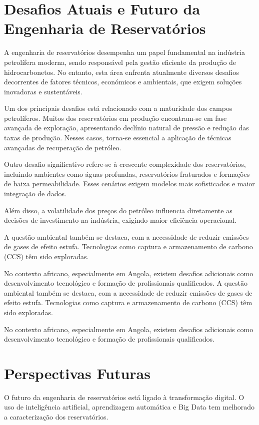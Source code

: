 \documentclass[12pt,a4paper]{report}
\begin{document}
\chapter{Desafios Atuais e Futuro da Engenharia de Reservatórios}

A engenharia de reservatórios desempenha um papel fundamental na indústria petrolífera moderna, sendo responsável pela gestão eficiente da produção de hidrocarbonetos. No entanto, esta área enfrenta atualmente diversos desafios decorrentes de fatores técnicos, económicos e ambientais, que exigem soluções inovadoras e sustentáveis.

Um dos principais desafios está relacionado com a maturidade dos campos petrolíferos. Muitos dos reservatórios em produção encontram-se em fase avançada de exploração, apresentando declínio natural de pressão e redução das taxas de produção. Nesses casos, torna-se essencial a aplicação de técnicas avançadas de recuperação de petróleo.

Outro desafio significativo refere-se à crescente complexidade dos reservatórios, incluindo ambientes como águas profundas, reservatórios fraturados e formações de baixa permeabilidade. Esses cenários exigem modelos mais sofisticados e maior integração de dados.

Além disso, a volatilidade dos preços do petróleo influencia diretamente as decisões de investimento na indústria, exigindo maior eficiência operacional.

A questão ambiental também se destaca, com a necessidade de reduzir emissões de gases de efeito estufa. Tecnologias como captura e armazenamento de carbono (CCS) têm sido exploradas.

No contexto africano, especialmente em Angola, existem desafios adicionais como desenvolvimento tecnológico e formação de profissionais qualificados.
A questão ambiental também se destaca, com a necessidade de reduzir emissões de gases de efeito estufa. Tecnologias como captura e armazenamento de carbono (CCS) têm sido exploradas.

No contexto africano, especialmente em Angola, existem desafios adicionais como desenvolvimento tecnológico e formação de profissionais qualificados.

\chapter{Perspectivas Futuras}

O futuro da engenharia de reservatórios está ligado à transformação digital. O uso de inteligência artificial, aprendizagem automática e Big Data tem melhorado a caracterização dos reservatórios.
\end{document}
